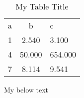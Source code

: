 \documentclass[]{article}
\begin{document}
\begin{table}
\centering
\begin{threeparttable}
\caption{My Table Title}
\begin{tabular}{lS[table-column-width=4cm]s}
\toprule
a & b & c\\
 1 &   2.540 &    3.100 \\
 4 &  50.000 &  654.000 \\
 7 &   8.114 &    9.541 \\
\bottomrule

\end{tabular}
\begin{tablenotes}
My below text
\end{tablenotes}
\end{threeparttable}
\end{table}
\end{document}

